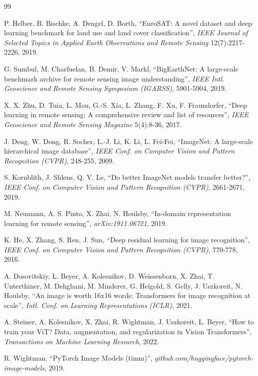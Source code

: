 \documentclass[twoside,a4paper,11pt]{article}
\begin{document}
\begin{thebibliography}{99}

P. Helber, B. Bischke, A. Dengel, D. Borth,
``EuroSAT: A novel dataset and deep learning benchmark for land use and land cover classification'',
{\em IEEE Journal of Selected Topics in Applied Earth Observations and Remote Sensing} 12(7):2217-2226, 2019.

G. Sumbul, M. Charfuelan, B. Demir, V. Markl,
``BigEarthNet: A large-scale benchmark archive for remote sensing image understanding'',
{\em IEEE Intl. Geoscience and Remote Sensing Symposium (IGARSS)}, 5901-5904, 2019.

X. X. Zhu, D. Tuia, L. Mou, G.-S. Xia, L. Zhang, F. Xu, F. Fraundorfer,
``Deep learning in remote sensing: A comprehensive review and list of resources'',
{\em IEEE Geoscience and Remote Sensing Magazine} 5(4):8-36, 2017.

J. Deng, W. Dong, R. Socher, L.-J. Li, K. Li, L. Fei-Fei,
``ImageNet: A large-scale hierarchical image database'',
{\em IEEE Conf. on Computer Vision and Pattern Recognition (CVPR)}, 248-255, 2009.

S. Kornblith, J. Shlens, Q. V. Le,
``Do better ImageNet models transfer better?'',
{\em IEEE Conf. on Computer Vision and Pattern Recognition (CVPR)}, 2661-2671, 2019.

M. Neumann, A. S. Pinto, X. Zhai, N. Houlsby,
``In-domain representation learning for remote sensing'',
{\em arXiv:1911.06721}, 2019.

K. He, X. Zhang, S. Ren, J. Sun,
``Deep residual learning for image recognition'',
{\em IEEE Conf. on Computer Vision and Pattern Recognition (CVPR)}, 770-778, 2016.

A. Dosovitskiy, L. Beyer, A. Kolesnikov, D. Weissenborn, X. Zhai, T. Unterthiner, M. Dehghani,
M. Minderer, G. Heigold, S. Gelly, J. Uszkoreit, N. Houlsby,
``An image is worth 16x16 words: Transformers for image recognition at scale'',
{\em Intl. Conf. on Learning Representations (ICLR)}, 2021.

A. Steiner, A. Kolesnikov, X. Zhai, R. Wightman, J. Uszkoreit, L. Beyer,
``How to train your ViT? Data, augmentation, and regularization in Vision Transformers'',
{\em Transactions on Machine Learning Research}, 2022.

R. Wightman,
``PyTorch Image Models (timm)'',
{\em github.com/huggingface/pytorch-image-models}, 2019.


\end{thebibliography}
\end{document}
